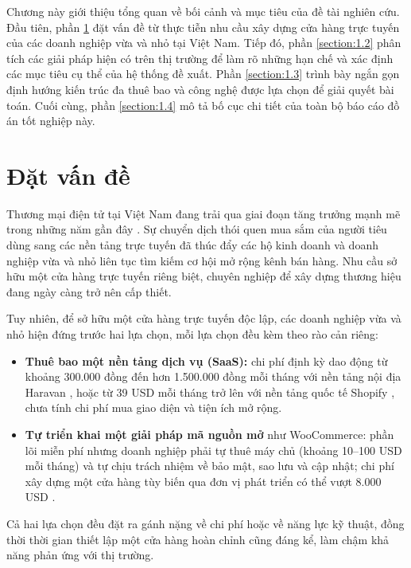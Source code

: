 \documentclass[../main.tex]{subfiles}
\begin{document}
Chương này giới thiệu tổng quan về bối cảnh và mục tiêu của đề tài nghiên cứu. Đầu tiên, phần \ref{section:1.1} đặt vấn đề từ thực tiễn nhu cầu xây dựng cửa hàng trực tuyến của các doanh nghiệp vừa và nhỏ tại Việt Nam. Tiếp đó, phần \ref{section:1.2} phân tích các giải pháp hiện có trên thị trường để làm rõ những hạn chế và xác định các mục tiêu cụ thể của hệ thống đề xuất. Phần \ref{section:1.3} trình bày ngắn gọn định hướng kiến trúc đa thuê bao và công nghệ được lựa chọn để giải quyết bài toán. Cuối cùng, phần \ref{section:1.4} mô tả bố cục chi tiết của toàn bộ báo cáo đồ án tốt nghiệp này.

\section{Đặt vấn đề}
\label{section:1.1}

Thương mại điện tử tại Việt Nam đang trải qua giai đoạn tăng trưởng mạnh mẽ trong những năm gần đây \cite{vecom}. Sự chuyển dịch thói quen mua sắm của người tiêu dùng sang các nền tảng trực tuyến đã thúc đẩy các hộ kinh doanh và doanh nghiệp vừa và nhỏ liên tục tìm kiếm cơ hội mở rộng kênh bán hàng. Nhu cầu sở hữu một cửa hàng trực tuyến riêng biệt, chuyên nghiệp để xây dựng thương hiệu đang ngày càng trở nên cấp thiết.

Tuy nhiên, để sở hữu một cửa hàng trực tuyến độc lập, các doanh nghiệp vừa và nhỏ hiện đứng trước hai lựa chọn, mỗi lựa chọn đều kèm theo rào cản riêng:

\begin{itemize}
    \item \textbf{Thuê bao một nền tảng dịch vụ (SaaS):} chi phí định kỳ dao động từ khoảng 300.000 đồng đến hơn 1.500.000 đồng mỗi tháng với nền tảng nội địa Haravan \cite{haravan_pricing2026}, hoặc từ 39 USD mỗi tháng trở lên với nền tảng quốc tế Shopify \cite{shopify_docs, shero_pricing2026}, chưa tính chi phí mua giao diện và tiện ích mở rộng.
    \item \textbf{Tự triển khai một giải pháp mã nguồn mở} như WooCommerce: phần lõi miễn phí nhưng doanh nghiệp phải tự thuê máy chủ (khoảng 10--100 USD mỗi tháng) và tự chịu trách nhiệm về bảo mật, sao lưu và cập nhật; chi phí xây dựng một cửa hàng tùy biến qua đơn vị phát triển có thể vượt 8.000 USD \cite{swell_woo2026}.
\end{itemize}

Cả hai lựa chọn đều đặt ra gánh nặng về chi phí hoặc về năng lực kỹ thuật, đồng thời thời gian thiết lập một cửa hàng hoàn chỉnh cũng đáng kể, làm chậm khả năng phản ứng với thị trường.
\end{document}
